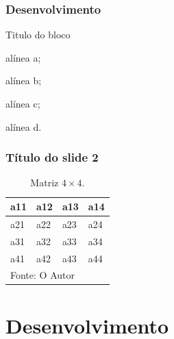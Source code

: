 \documentclass[aspectratio=169,t,xcolor=table]{beamer}
\begin{document}
\begin{frame}
\frametitle{Desenvolvimento}

\begin{block}{Titulo do bloco}
\begin{description}
	\item<1->[a)] alínea a;
	\item<2->[b)] alínea b;
	\item<3->[c)] alínea c;
	\item<4->[d)] alínea d.
\end{description}
\end{block}
	
\end{frame}

\begin{frame}
\frametitle{Título do slide 2}
\begin{table}[]
\centering
\caption{Matriz $4\times 4$.}
\begin{tabular}{p{0.5cm}|p{0.5cm}|p{0.5cm}|p{0.5cm}}
\hline
a11 & a12 & a13 & a14 \\ 
\hline
a21 & a22 & a23 & a24 \\ 
\hline
a31 & a32 & a33 & a34 \\ 
\hline
a41 & a42 & a43 & a44 \\ 
\hline
\multicolumn{4}{l}{Fonte: O Autor} \\ 
\end{tabular}
\end{table}

\end{frame}

\section{Desenvolvimento}

\end{document}
